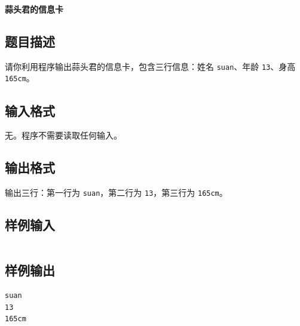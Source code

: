 \documentclass{article}
\newcommand{\problemname}[1]{\begin{center}\Large\bfseries #1\end{center}}
\begin{document}
\problemname{蒜头君的信息卡}

\subsection*{题目描述}
请你利用程序输出蒜头君的信息卡，包含三行信息：姓名 \texttt{suan}、年龄 \texttt{13}、身高 \texttt{165cm}。

\subsection*{输入格式}
无。程序不需要读取任何输入。

\subsection*{输出格式}
输出三行：第一行为 \texttt{suan}，第二行为 \texttt{13}，第三行为 \texttt{165cm}。

\subsection*{样例输入}
\begin{verbatim}

\end{verbatim}

\subsection*{样例输出}
\begin{verbatim}
suan
13
165cm
\end{verbatim}
\end{document}
